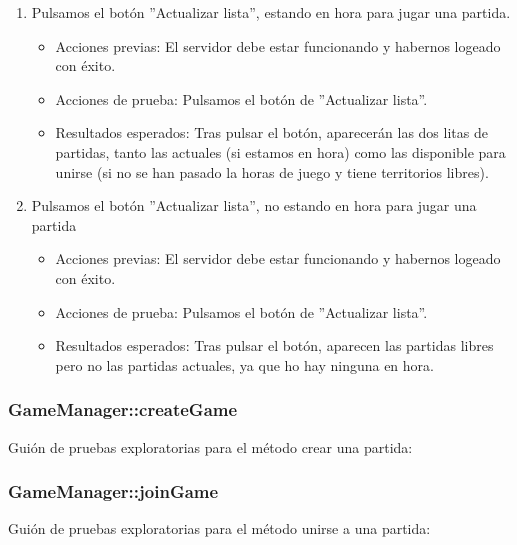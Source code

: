\begin{enumerate}
\item Pulsamos el botón ''Actualizar lista'', estando en hora para jugar una partida.
	\begin{itemize}
	\item Acciones previas: El servidor debe estar funcionando y habernos logeado con éxito.
	\item Acciones de prueba: Pulsamos el botón de ''Actualizar lista''.
	\item Resultados esperados: Tras pulsar el botón, aparecerán las dos litas de partidas, tanto las actuales (si estamos en hora) como las disponible para unirse (si no se han pasado la horas de juego y tiene territorios libres).
	\end{itemize}
\item Pulsamos el botón ''Actualizar lista'', no estando en hora para jugar una partida
	\begin{itemize}
	\item Acciones previas: El servidor debe estar funcionando y habernos logeado con éxito.
	\item Acciones de prueba: Pulsamos el botón de ''Actualizar lista''.
	\item Resultados esperados: Tras pulsar el botón, aparecen las partidas libres pero no las partidas actuales, ya que ho hay ninguna en hora.
	\end{itemize}
\end{enumerate}

\subsubsection{GameManager::createGame}

Guión de pruebas exploratorias para el método crear una partida:

\subsubsection{GameManager::joinGame}

Guión de pruebas exploratorias para el método unirse a una partida:

